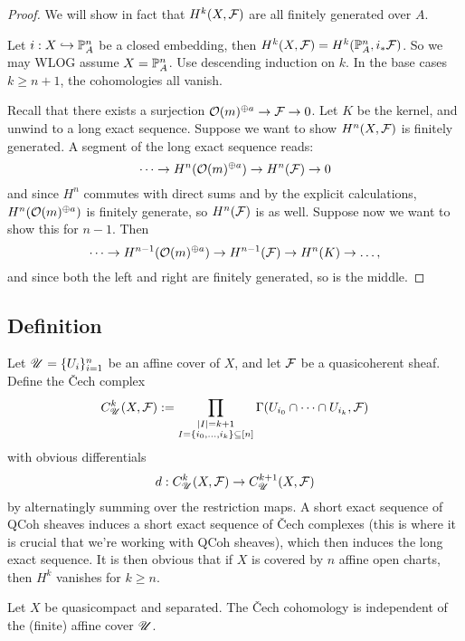\documentclass[11pt]{amsart}
\begin{document}
\begin{proof}
    We will show in fact that $H^k(X, \mathcal{F})$ are all finitely generated over $A$.

    Let $i: X\hookrightarrow \mathbb{P}^n_A$ be a closed embedding, then $H^k(X, \mathcal{F}) = H^k(\mathbb{P}^n_A, i_\ast \mathcal{F})$. So we may WLOG assume $X = \mathbb{P}^n_A$. Use descending induction on $k$. In the base cases $k\ge n+1$, the cohomologies all vanish.

    Recall that there exists a surjection $\mathcal{O}(m)^{\oplus a} \to \mathcal{F}\to 0$. Let $K$ be the kernel, and unwind to a long exact sequence. Suppose we want to show $H^n(X, \mathcal{F})$ is finitely generated. A segment of the long exact sequence reads:
    \[\dots \to H^n(\mathcal{O}(m)^{\oplus a}) \to H^n(\mathcal{F}) \to 0\]
    and since $H^n$ commutes with direct sums and by the explicit calculations, $H^n(\mathcal{O}(m)^{\oplus a})$ is finitely generate, so $H^n(\mathcal{F})$ is as well. Suppose now we want to show this for $n-1$. Then
    \[\dots \to H^{n-1}(\mathcal{O}(m)^{\oplus a}) \to H^{n-1}(\mathcal{F}) \to H^n(K) \to \dots,\]
    and since both the left and right are finitely generated, so is the middle.
\end{proof}


\subsection{Definition}

Let $\mathscr{U} = \{U_i\}_{i=1}^n$ be an affine cover of $X$, and let $\mathcal{F}$ be a quasicoherent sheaf. Define the \v{C}ech complex
\[C^k_{\mathscr{U}}(X, \mathcal{F}) := \prod_{\substack{|I| = k+1 \\ I = \{i_0,\dots,i_k\} \subseteq [n]}} \Gamma(U_{i_0}\cap\dots\cap U_{i_k}, \mathcal{F})\]
with obvious differentials
\[d: C^k_{\mathscr{U}}(X, \mathcal{F}) \to C^{k+1}_{\mathscr{U}}(X, \mathcal{F})\]
by alternatingly summing over the restriction maps. A short exact sequence of QCoh sheaves induces a short exact sequence of \v{C}ech complexes (this is where it is crucial that we're working with QCoh sheaves), which then induces the long exact sequence. It is then obvious that if $X$ is covered by $n$ affine open charts, then $H^k$ vanishes for $k\ge n$.

\begin{thm}
    Let $X$ be quasicompact and separated. The \v{C}ech cohomology is independent of the (finite) affine cover $\mathscr{U}$.
\end{thm}
\end{document}
